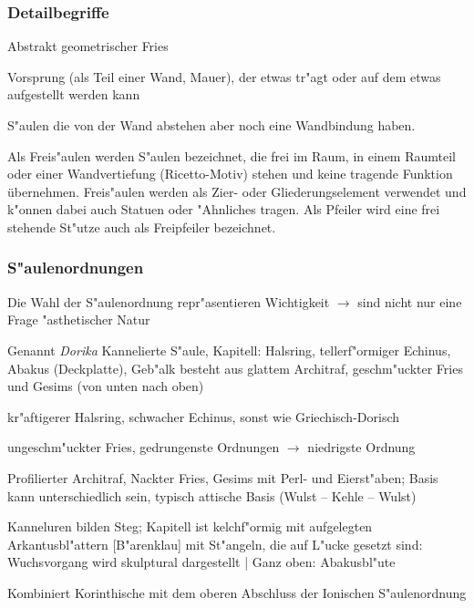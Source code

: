 \documentclass[emulatestandardclasses]{scrartcl}
\begin{document}
\subsubsection{Detailbegriffe}

\begin{description}[leftmargin=!,labelwidth=\widthof{\bfseries Zahnschnitt}]
  \item[Zahnschnitt] Abstrakt geometrischer Fries
  \item[Konsole] Vorsprung (als Teil einer Wand, Mauer), der etwas tr"agt oder auf dem etwas aufgestellt werden kann
  \item[Vorlage] S"aulen die von der Wand abstehen aber noch eine Wandbindung haben.
  \item[Freis"aule] Als Freis"aulen werden S"aulen bezeichnet, die frei im Raum, in einem Raumteil oder einer Wandvertiefung (Ricetto-Motiv) stehen und keine tragende Funktion übernehmen. Freis"aulen werden als Zier- oder Gliederungselement verwendet und k"onnen dabei auch Statuen oder "Ahnliches tragen. Als Pfeiler wird eine frei stehende St"utze auch als Freipfeiler bezeichnet.
\end{description}

\subsubsection{S"aulenordnungen}

Die Wahl der S"aulenordnung repr"asentieren Wichtigkeit $\rightarrow$ sind nicht nur eine Frage "asthetischer Natur\\

\begin{description}[leftmargin=!,labelwidth=\widthof{\bfseries Griechisch-Doris}]
  \item[Griechisch-Dorisch] Genannt \emph{Dorika} Kannelierte S"aule, Kapitell: Halsring, tellerf"ormiger Echinus, Abakus (Deckplatte), Geb"alk besteht aus glattem Architraf, geschm"uckter Fries und Gesims (von unten nach oben) 
  \item[R"omisch-Dorisch] kr"aftigerer Halsring, schwacher Echinus, sonst wie Griechisch-Dorisch
  \item[Toskanisch] ungeschm"uckter Fries, gedrungenste Ordnungen $\rightarrow$ niedrigste Ordnung
  \item[Ionisch] Profilierter Architraf, Nackter Fries, Gesims mit Perl- und Eierst"aben; Basis kann unterschiedlich sein, typisch attische Basis (Wulst -- Kehle -- Wulst)
  \item[Korinthisch] Kanneluren bilden Steg; Kapitell ist kelchf"ormig mit aufgelegten Arkantusbl"attern [B"arenklau] mit St"angeln, die auf L"ucke gesetzt sind: Wuchsvorgang wird skulptural dargestellt | Ganz oben: Abakusbl"ute
  \item[Komposit] Kombiniert Korinthische mit dem oberen Abschluss der Ionischen S"aulenordnung

\end{description}
\end{document}
